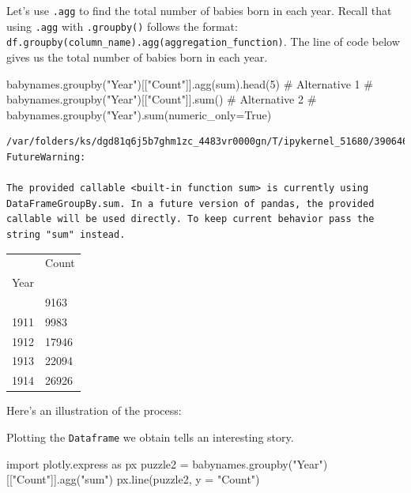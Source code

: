 \documentclass[
  letterpaper,
  DIV=11,
  numbers=noendperiod]{scrreprt}
\newenvironment{Shaded}{\begin{snugshade}}{\end{snugshade}}
\newcommand{\BuiltInTok}[1]{\textcolor[rgb]{0.00,0.23,0.31}{#1}}
\newcommand{\CommentTok}[1]{\textcolor[rgb]{0.37,0.37,0.37}{#1}}
\newcommand{\DecValTok}[1]{\textcolor[rgb]{0.68,0.00,0.00}{#1}}
\newcommand{\ImportTok}[1]{\textcolor[rgb]{0.00,0.46,0.62}{#1}}
\newcommand{\NormalTok}[1]{\textcolor[rgb]{0.00,0.23,0.31}{#1}}
\newcommand{\OperatorTok}[1]{\textcolor[rgb]{0.37,0.37,0.37}{#1}}
\newcommand{\StringTok}[1]{\textcolor[rgb]{0.13,0.47,0.30}{#1}}
\begin{document}
Let's use \texttt{.agg} to find the total number of babies born in each
year. Recall that using \texttt{.agg} with \texttt{.groupby()} follows
the format:
\texttt{df.groupby(column\_name).agg(aggregation\_function)}. The line
of code below gives us the total number of babies born in each year.

\begin{Shaded}
\begin{Highlighting}[]
\NormalTok{babynames.groupby(}\StringTok{"Year"}\NormalTok{)[[}\StringTok{"Count"}\NormalTok{]].agg(}\BuiltInTok{sum}\NormalTok{).head(}\DecValTok{5}\NormalTok{)}
\CommentTok{\# Alternative 1}
\CommentTok{\# babynames.groupby("Year")[["Count"]].sum()}
\CommentTok{\# Alternative 2}
\CommentTok{\# babynames.groupby("Year").sum(numeric\_only=True)}
\end{Highlighting}
\end{Shaded}

\begin{verbatim}
/var/folders/ks/dgd81q6j5b7ghm1zc_4483vr0000gn/T/ipykernel_51680/390646742.py:1: FutureWarning:

The provided callable <built-in function sum> is currently using DataFrameGroupBy.sum. In a future version of pandas, the provided callable will be used directly. To keep current behavior pass the string "sum" instead.
\end{verbatim}

\begin{longtable}[]{@{}ll@{}}
\toprule\noalign{}
& Count \\
Year & \\
\midrule\noalign{}
\endhead
\bottomrule\noalign{}
\endlastfoot
1910 & 9163 \\
1911 & 9983 \\
1912 & 17946 \\
1913 & 22094 \\
1914 & 26926 \\
\end{longtable}

Here's an illustration of the process:

Plotting the \texttt{Dataframe} we obtain tells an interesting story.

\begin{Shaded}
\begin{Highlighting}[]
\ImportTok{import}\NormalTok{ plotly.express }\ImportTok{as}\NormalTok{ px}
\NormalTok{puzzle2 }\OperatorTok{=}\NormalTok{ babynames.groupby(}\StringTok{"Year"}\NormalTok{)[[}\StringTok{"Count"}\NormalTok{]].agg(}\StringTok{"sum"}\NormalTok{)}
\NormalTok{px.line(puzzle2, y }\OperatorTok{=} \StringTok{"Count"}\NormalTok{)}
\end{Highlighting}
\end{Shaded}
\end{document}
